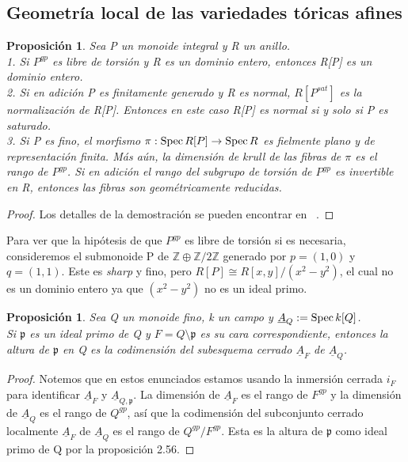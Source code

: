 \documentclass[12pt,spanish]{amsart}
\newcommand{\bb}[1]{\mathbb{#1}}
\newcommand{\fk}[1]{\mathfrak{#1}}
\def\Spec{\mathop{\mbox{\normalfont Spec}}\nolimits}
\newtheorem{prop}[Theorem]{Proposición}
\theoremstyle{definition}
\theoremstyle{remark}
\begin{document}
\subsection{Geometría local de las variedades tóricas afines}
\begin{prop}
Sea P un monoide \textit{integral} y R un anillo. \\
1. Si $P^{gp}$ es libre de torsión y R es un dominio entero, entonces R[P] es un dominio entero. \\
2. Si en adición P es finitamente generado y R es normal, $R[P^{sat}]$ es la normalización de R[P]. Entonces en este caso R[P] es normal si y solo si P es saturado. \\
3. Si P es fino, el morfismo $\pi: \Spec{R[P]} \to \Spec{R}$ es  fielmente plano y de representación finita. Más aún, la dimensión de krull de las fibras de $\pi$ es el rango de $P^{gp}$. Si en adición el rango del subgrupo de torsión de $P^{gp}$ es invertible en R, entonces las fibras son geométricamente reducidas.  
\end{prop}

\begin{proof}
Los detalles de la demostración se pueden encontrar en ~\cite{Ogus:2018aa}. 
\end{proof}


Para ver que la hipótesis de que $P^{gp}$ es libre de torsión si es necesaria, consideremos el submonoide P de $\bb{Z}\oplus \bb{Z}/ 2\bb{Z}$ generado por $p=(1,0)$ y $q=(1,1)$. Este es \textit{sharp} y fino, pero $R[P] \cong R[x,y]/(x^{2}-y^{2})$, el cual no es un dominio entero ya que $(x^{2}-y^{2})$ no es un ideal primo.

\begin{prop}
Sea Q un monoide fino, k un campo y $\underline{A}_{Q}:=\Spec{k[Q]}$. \\
Si $\fk{p}$ es un ideal primo de Q y $F=Q \setminus \fk{p}$ es su cara correspondiente, entonces la altura de $\fk{p}$ en Q es la codimensión del subesquema cerrado $\underline{A}_{F}$ de $\underline{A}_{Q}$.
\end{prop}

\begin{proof}
Notemos que en estos enunciados estamos usando la inmersión cerrada $i_{F}$ para identificar $\underline{A}_{F}$ y $\underline{A}_{Q,\fk{p}}$. La dimensión de $\underline{A}_{F}$ es el rango de $F^{gp}$ y la dimensión de $\underline{A}_{Q}$ es el rango de $Q^{gp}$, así que la codimensión del subconjunto cerrado localmente $\underline{A}_{F}$ de $\underline{A}_{Q}$ es el rango de $Q^{gp}/F^{gp}$. Esta es la altura de $\fk{p}$ como ideal primo de Q por la proposición 2.56. 
\end{proof}
\end{document}
